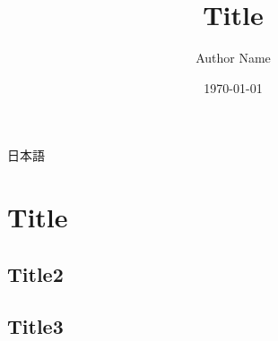 \documentclass[a4j,11pt,uplatex,dvipdfmx]{jsarticle}
\begin{document}
\title{Title}
\author{Author Name}
\date{\today}
\maketitle

日本語

\section{Title}
\lipsum[1-2]

\subsection{Title2}
\lipsum[3-5]

\subsection{Title3}
\lipsum[6-7]


\end{document}
